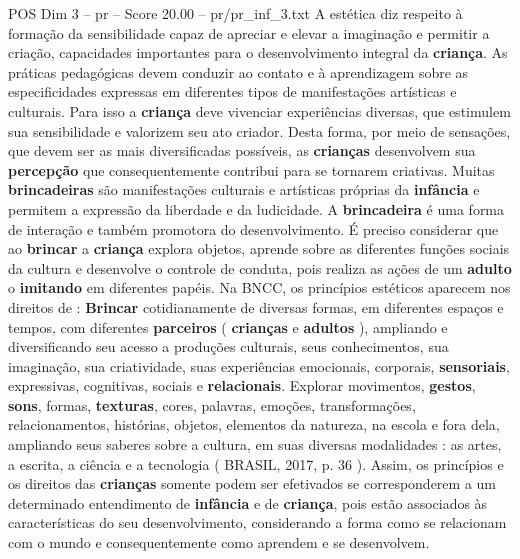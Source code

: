 \begin{textsample}{POS Dim 3 – pr – Score 20.00 – pr/pr\_inf\_3.txt}
A estética diz respeito à formação da sensibilidade capaz de apreciar e elevar a imaginação e permitir a criação, capacidades importantes para o desenvolvimento integral da \textbf{criança}.
As práticas pedagógicas devem conduzir ao contato e à aprendizagem sobre as especificidades expressas em diferentes tipos de manifestações artísticas e culturais.
Para isso a \textbf{criança} deve vivenciar experiências diversas, que estimulem sua sensibilidade e valorizem seu ato criador.
Desta forma, por meio de sensações, que devem ser as mais diversificadas possíveis, as \textbf{crianças} desenvolvem sua \textbf{percepção} que consequentemente contribui para se tornarem criativas.
Muitas \textbf{brincadeiras} são manifestações culturais e artísticas próprias da \textbf{infância} e permitem a expressão da liberdade e da ludicidade.
A \textbf{brincadeira} é uma forma de interação e também promotora do desenvolvimento.
É preciso considerar que ao \textbf{brincar} a \textbf{criança} explora objetos, aprende sobre as diferentes funções sociais da cultura e desenvolve o controle de conduta, pois realiza as ações de um \textbf{adulto} o \textbf{imitando} em diferentes papéis.
Na BNCC, os princípios estéticos aparecem nos direitos de : \textbf{Brincar} cotidianamente de diversas formas, em diferentes espaços e tempos, com diferentes \textbf{parceiros} ( \textbf{crianças} e \textbf{adultos} ), ampliando e diversificando seu acesso a produções culturais, seus conhecimentos, sua imaginação, sua criatividade, suas experiências emocionais, corporais, \textbf{sensoriais}, expressivas, cognitivas, sociais e \textbf{relacionais}.
Explorar movimentos, \textbf{gestos}, \textbf{sons}, formas, \textbf{texturas}, cores, palavras, emoções, transformações, relacionamentos, histórias, objetos, elementos da natureza, na escola e fora dela, ampliando seus saberes sobre a cultura, em suas diversas modalidades : as artes, a escrita, a ciência e a tecnologia ( BRASIL, 2017, p. 36 ).
Assim, os princípios e os direitos das \textbf{crianças} somente podem ser efetivados se corresponderem a um determinado entendimento de \textbf{infância} e de \textbf{criança}, pois estão associados às características do seu desenvolvimento, considerando a forma como se relacionam com o mundo e consequentemente como aprendem e se desenvolvem.

\end{textsample}
